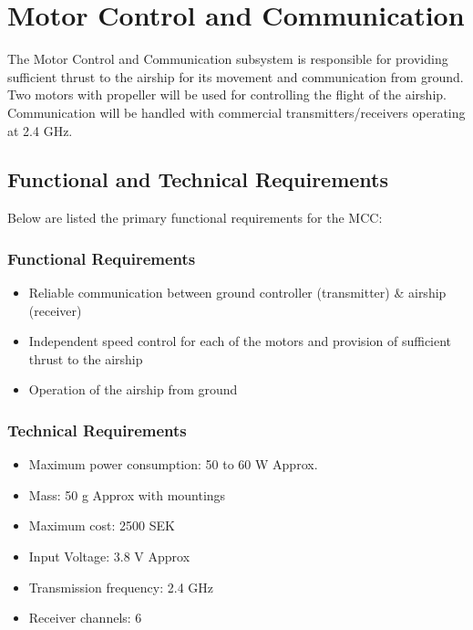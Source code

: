 \chapter{Motor Control and Communication}
\label{chap:mcc}

The Motor Control and Communication subsystem is responsible for providing sufficient thrust to the airship for its movement and communication from ground. Two motors with propeller will be used for controlling the flight of the airship. Communication will be handled with commercial transmitters/receivers operating at 2.4 GHz. 

\section{Functional and Technical Requirements}

Below are listed the primary functional requirements for the \ac{MCC}:

\subsection{Functional Requirements}

\begin{itemize}
\item Reliable communication between ground controller (transmitter) \& airship (receiver)
\item Independent speed control for each of the motors and provision of sufficient thrust to the airship
\item Operation of the airship from ground 
\end{itemize}

\subsection{Technical Requirements}

\enlargethispage{1.0em}

\begin{itemize}
\item Maximum power consumption: 50 to 60 W Approx. 
\item Mass: 50 g Approx with mountings
\item Maximum cost: 2500 SEK
\item Input Voltage: 3.8 V Approx
\item Transmission frequency: 2.4 GHz
\item Receiver channels: 6
\end{itemize}

